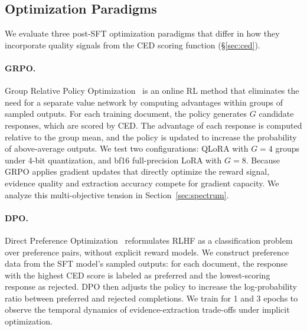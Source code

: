 \subsection{Optimization Paradigms}
\label{sec:paradigms}

We evaluate three post-SFT optimization paradigms that differ in how they incorporate quality signals from the CED scoring function (\S\ref{sec:ced}).

\paragraph{GRPO.}
Group Relative Policy Optimization~\citep{shao2024deepseekmath} is an online RL method that eliminates the need for a separate value network by computing advantages within groups of sampled outputs. For each training document, the policy generates $G$ candidate responses, which are scored by CED. The advantage of each response is computed relative to the group mean, and the policy is updated to increase the probability of above-average outputs. We test two configurations: QLoRA with $G{=}4$ groups under 4-bit quantization, and bf16 full-precision LoRA with $G{=}8$. Because GRPO applies gradient updates that directly optimize the reward signal, evidence quality and extraction accuracy compete for gradient capacity. We analyze this multi-objective tension in Section~\ref{sec:spectrum}.

\paragraph{DPO.}
Direct Preference Optimization~\citep{rafailov2023direct} reformulates RLHF as a classification problem over preference pairs, without explicit reward models. We construct preference data from the SFT model's sampled outputs: for each document, the response with the highest CED score is labeled as preferred and the lowest-scoring response as rejected. DPO then adjusts the policy to increase the log-probability ratio between preferred and rejected completions. We train for 1 and 3 epochs to observe the temporal dynamics of evidence-extraction trade-offs under implicit optimization.

